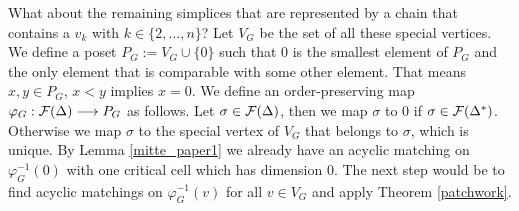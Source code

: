 \documentclass{elsarticle}
\begin{document}
What about the remaining simplices that are represented by a chain that contains a $v_k$ with $k\in\{2,\ldots, n\}$? Let $V_G$ be the set of all these special vertices. We define a poset $P_G:=V_G\cup\{0\}$ such that $0$ is the smallest element of $P_G$ and the only element that is comparable with some other element. That means $x,y\in P_G$, $x<y$ implies $x=0$. We define an order-preserving map $\varphi_G:{\cal F}(\Delta)\longrightarrow P_G$ as follows. Let $\sigma\in{\cal F}(\Delta)$, then we map $\sigma$ to $0$ if $\sigma\in{\cal F}(\Delta^*)$. Otherwise we map $\sigma$ to the special vertex of $V_G$ that belongs to $\sigma$, which is unique. By Lemma \ref{mitte_paper1} we already have an acyclic matching on $\varphi_G^{-1}(0)$ with one critical cell which has dimension $0$. The next step would be to find acyclic matchings on $\varphi_G^{-1}(v)$ for all $v\in V_G$ and apply Theorem \ref{patchwork}.
\end{document}
